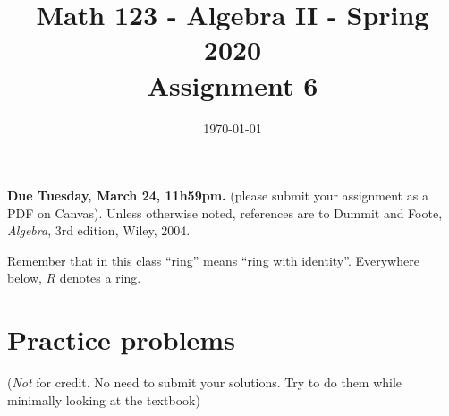 \documentclass{amsart}
\title[Math 123, Spring 2020: assignment 6]{Math 123 - Algebra II - Spring 2020 \\ Assignment 6}
\date{\today}
\theoremstyle{definition}
\begin{document}

\vspace*{-10em}
\maketitle

\textbf{Due Tuesday, March 24, 11h59pm.} (please submit your assignment as a PDF on Canvas). Unless otherwise noted, references are to Dummit and Foote, \emph{Algebra}, 3rd edition, Wiley, 2004.

Remember that in this class ``ring'' means ``ring with identity''. Everywhere below, $R$ denotes a ring.

\section*{Practice problems} (\emph{Not} for credit. No need to submit your solutions. Try to do them while minimally looking at the textbook)
\end{document}
